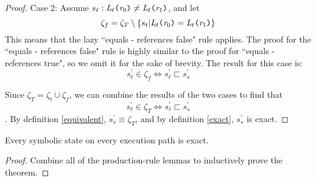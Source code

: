 \begin{proof}
Case 2: Assume $s_\ell : \emph{L}_\ell \texttt{(} \emph{r}_0\texttt{)} \neq \emph{L}_\ell \texttt{(} \emph{r}_1 \texttt{)}$, and let 
$$\zeta_f = \zeta_T \setminus \{ s_t | \emph{L}_t \texttt{(} \emph{r}_0\texttt{)} = \emph{L}_t \texttt{(} \emph{r}_1 \texttt{)} \}$$ 
This means that the lazy ``equals - references false" rule applies. The proof for the ``equals - references false" rule is highly similar to the proof for ``equals - references true", so we omit it for the sake of brevity. The result for this case is:
$$s_\ell^\prime \in \zeta_f \Leftrightarrow s_\ell^\prime \sqsubset s_s^\prime$$

Since $\zeta_T = \zeta_t \cup \zeta_f$, we can combine the results of the two cases to find that $$s_\ell^\prime \in \zeta_T \Leftrightarrow s_\ell^\prime \sqsubset s_s^\prime$$. By definition \ref{equivalent}, $s_s^\prime \equiv \zeta_T$, and by definition \ref{exact}, $s_s^\prime$ is exact.
\end{proof}

\begin{theorem}
Every symbolic state on every execution path is exact.
\end{theorem}
\begin{proof}
Combine all of the production-rule lemmas to inductively prove the theorem.
\end{proof}
